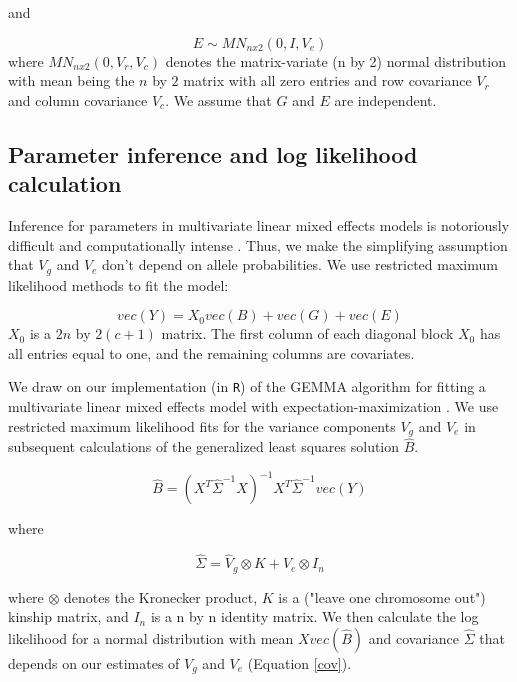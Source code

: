 \documentclass[12pt,twoside, lineno]{gsajnl}
\begin{document}
and

\begin{equation}
E \sim MN_{nx2}(0, I, V_e)
\label{eqn:model3}
\end{equation}
where $MN_{n x 2}(0, V_r, V_c)$ denotes the matrix-variate (n by 2) normal distribution with mean being the $n$ by $2$ matrix with all zero entries and row covariance $V_r$ and column covariance $V_c$. We assume that $G$ and $E$ are independent.


\subsection{Parameter inference and log likelihood calculation}

Inference for parameters in multivariate linear mixed effects models is notoriously difficult and computationally intense \citep{meyer1989restricted,meyer1991estimating}. Thus, we make the simplifying assumption that $V_g$ and $V_e$ don't depend on allele probabilities. We use restricted maximum likelihood methods to fit the model:

\begin{equation}
vec(Y) = X_0vec(B) + vec(G) + vec(E)
\label{model}
\end{equation}
$X_0$ is a $2n$ by $2(c + 1)$ matrix. The first column of each diagonal block $X_0$ has all entries equal to one, and the remaining columns are covariates.

We draw on our implementation \citep{gemma2} (in \texttt{R}) of the GEMMA algorithm for fitting a multivariate linear mixed effects model with expectation-maximization \citep{zhou2014efficient}. We use restricted maximum likelihood fits for the variance components $V_g$ and $V_e$ in subsequent calculations of the generalized least squares solution $\hat B$.

\begin{equation}
    \hat B = (X^T\hat\Sigma^{-1}X)^{-1}X^T\hat\Sigma^{-1}vec(Y)
\end{equation}

\noindent where

\begin{equation}
    \hat\Sigma = \hat V_g \otimes K + \hat V_e \otimes I_n
    \label{cov}
\end{equation}

\noindent where $\otimes$ denotes the Kronecker product, $K$ is a ("leave one chromosome out") kinship matrix, and $I_n$ is a n by n identity matrix. We then calculate the log likelihood for a normal distribution with mean $X vec(\hat B)$ and covariance $\hat \Sigma$ that depends on our estimates of $V_g$ and $V_e$ (Equation \ref{cov}).
\end{document}
